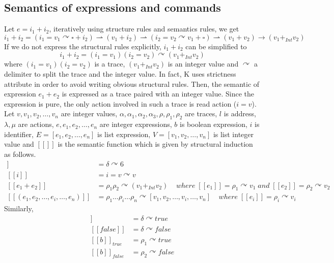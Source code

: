 \documentclass{lmcs} %
\theoremstyle{plain}\newtheorem{satz}[thm]{Satz} %
\begin{document}
\subsection*{Semantics of expressions and commands}
Let $e=i_1+i_2$, iteratively using structure rules and semantics rules, we get
$$i_1+i_2=(i_1=v_1\curvearrowright \square+i_2)\rightharpoonup(v_1+i_2)\rightharpoonup(i_2=v_2\curvearrowright v_1+\square)\rightharpoonup(v_1+v_2)\rightarrow (v_1+_{Int}v_2)$$
If we do not express the structural rules explicitly, $i_1+i_2$ can be simplified to
$$i_1+i_2= (i_1=v_1)(i_2=v_2)\curvearrowright(v_1+_{Int}v_2)$$
where $(i_1=v_1)(i_2=v_2)$ is a trace, $(v_1+_{Int}v_2)$ is an integer value and $\curvearrowright$ a delimiter to split the trace and the integer value. In fact, K uses strictness attribute in order to avoid writing obvious structural rules.
Then, the semantic of expression $e_1+e_2$ is expressed as a trace paired with an integer value. Since the expression is pure, the only action involved in such a trace is read action ($i=v$).\\
Let $v, v_1, v_2, \ldots, v_n$ are integer values, $\alpha, \alpha_1, \alpha_2, \alpha_3, \rho, \rho_1, \rho_2$ are traces, $l$ is address, $\lambda, \mu$ are actions, $e, e_1, e_2, \ldots, e_n$ are integer expressions, $b$ is boolean expression, $i$ is identifier,  $E\!=\![e_1,e_2,\!\ldots\!, e_n]$ is list expression, $V=[v_1,v_2,\ldots, v_n]$ is list integer value and $[\![]\!]$ is the semantic function which is given by structural induction as follows.
\begin{align*}
  [\![6]\!]&=\delta\curvearrowright6\\
  [\![i]\!]&=i=v\curvearrowright v\\
  [\![e_1+e_2]\!]&=\rho_1\rho_2\curvearrowright (v_1+_{Int}v_2)\;\;\;\; where\; [\![e_1]\!]=\rho_1\curvearrowright v_1\; and\; [\![e_2]\!]=\rho_2\curvearrowright v_2\\
  [\![(e_1,e_2,\ldots,e_i,\ldots,e_n)]\!]&=\rho_1\ldots\rho_i\ldots\rho_n\curvearrowright[v_1,v_2,\ldots,v_i,\ldots,v_n]\;\;\;\;where\;[\![e_i]\!]=\rho_i\curvearrowright v_i
\end{align*}
Similarly,
\begin{align*}
  [\![true]\!]&=\delta\curvearrowright true\\
  [\![false]\!]&=\delta\curvearrowright false\\
  [\![b]\!]_{true}&=\rho_1\curvearrowright true\\
  [\![b]\!]_{false}&=\rho_2\curvearrowright false
\end{align*}
\end{document}

